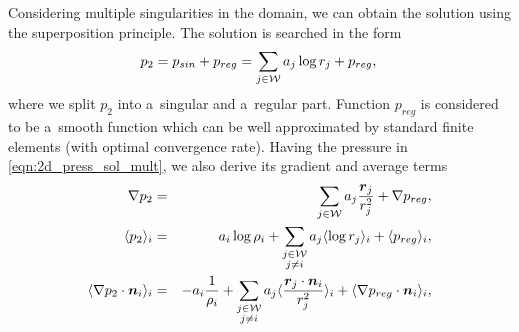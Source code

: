 %
Considering multiple singularities in the domain, we can obtain the solution using the superposition principle.
The solution is searched in the form
\begin{equation}
p_2 = p_{sin} + p_{reg} = \sum\limits_{j\in\mathcal{W}} a_j\log r_j + p_{reg}, \label{eqn:2d_press_sol_mult}\\
\end{equation}
where we split $p_2$ into a~singular and a~regular part. Function $p_{reg}$ is considered to be a~smooth function
which can be well approximated by standard finite elements (with optimal convergence rate).
Having the pressure in \eqref{eqn:2d_press_sol_mult}, we also derive its gradient and average terms
\begin{eqnarray}
\nabla p_2 &=& \sum\limits_{j\in\mathcal{W}} a_j\frac{\mathbf{\boldsymbol{r}}_j}{r_j^2} + \nabla p_{reg}, \label{eqn:2d_press_grad_sol_mult}\\
\langle p_2\rangle_i &=& a_i\log\rho_i + \sum\limits_{\substack{j\in\mathcal{W}\\ j\neq i}} a_j \langle\log r_j\rangle_i + \langle p_{reg}\rangle_i, \label{eqn:2d_avg_press_sol_mult}\\
\langle\nabla p_2 \cdot \mathbf{\boldsymbol{n}}_i\rangle_i &=& -a_i\frac{1}{\rho_i} + \sum\limits_{\substack{j\in\mathcal{W}\\ j\neq i}} 
        a_j \langle\frac{\mathbf{\boldsymbol{r}}_j \cdot \mathbf{\boldsymbol{n}}_i}{r_j^2}\rangle_i + \langle\nabla p_{reg} \cdot \mathbf{\boldsymbol{n}}_i\rangle_i, \label{eqn:2d_avg_press_grad_sol_mult}
\end{eqnarray}

